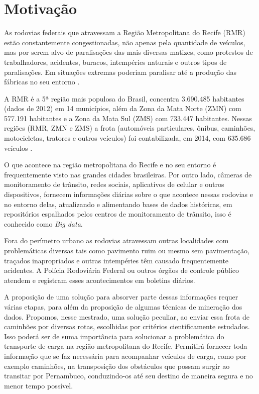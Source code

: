 
\section{ Motivação}\label{intro:motivacao}

As rodovias federais que atravessam a Região Metropolitana do Recife (RMR) estão constantemente congestionadas, não apenas pela 
quantidade de veículos, mas por serem alvo de paralisações das mais diversas matizes, como protestos de trabalhadores, acidentes, 
buracos, intempéries naturais e outros tipos de paralisações. 
Em situações extremas poderiam paralisar até a produção das fábricas no seu entorno \cite{BNDES2013}. 

A RMR é a 5ª região mais populosa do Brasil, concentra 3.690.485 habitantes (dados de 2012) \cite{Bitoun2012} em 14 municípios, além da 
Zona da Mata Norte (ZMN) com 577.191 habitantes e a Zona da Mata Sul (ZMS) com 733.447 habitantes. 
Nessas regiões (RMR, ZMN e ZMS) a frota (automóveis particulares, ônibus, caminhões, motocicletas, tratores e outros veículos) 
foi contabilizada, em 2014, com 635.686 veículos \cite{FrotaVeiculosIBGE}.

O que acontece na região metropolitana do Recife e no seu entorno é frequentemente visto nas grandes cidades brasileiras.
Por outro lado, câmeras de monitoramento de trânsito, redes sociais, aplicativos de celular e outros dispositivos, fornecem informações diárias sobre o que acontece nessas 
rodovias e no entorno delas, atualizando e alimentando bases de dados históricas, em repositórios espalhados pelos centros de 
monitoramento de trânsito, isso é conhecido como \textit{Big data}.

Fora do perímetro urbano as rodovias atravessam outras localidades com problemáticas diversas tais como pavimento ruim ou mesmo sem pavimentação, 
traçados inapropriados e outras intempéries têm causado frequentemente acidentes.
A Polícia Rodoviária Federal ou outros órgãos de controle público atendem e registram esses acontecimentos em boletins diários.

A proposição de uma solução para absorver parte dessas informações requer várias etapas, para além da proposição de algumas técnicas de mineração dos dados.
Propomos, nesse mestrado, uma solução peculiar, ao enviar essa frota de caminhões por diversas rotas, escolhidas por critérios cientificamente estudados.
Isso poderá ser de suma importância para solucionar a problemática do transporte de carga na região metropolitana 
do Recife. Permitirá fornecer toda informação que se faz necessária para acompanhar veículos de carga, como por exemplo caminhões, 
na transposição dos obstáculos que possam surgir ao transitar por Pernambuco, conduzindo-os até seu destino de maneira segura e no menor tempo possível.


